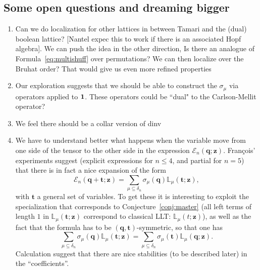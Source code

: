 \documentclass[12pt]{amsart}
\theoremstyle{plain}
\theoremstyle{definition}
\theoremstyle{remark}
\newcommand{\Qvar}{{\bm q}}
\newcommand{\Zvar}{{\bm z}}
\begin{document}
\subsection{Some open questions and dreaming bigger}

\begin{enumerate}
\item Can we do localization for other lattices in between Tamari and the (dual) boolean lattice? [Nantel expec this to work if there is an associated Hopf algebra]. We can push the idea in the other direction, Is there an analogue of Formula~\eqref{eq:multishuff} over permutations? We can then localize over the Bruhat order? That would give us even more refined properties
\item Our exploration suggests that we should be able to construct the $\sigma_\mu$ via operators applied to $\bf 1$. These operators could be ``dual" to the Carlson-Mellit operator?
\item We feel there should be a collar version of dinv
\item We have to understand better what happens when the variable move from one side of the tensor to the other side in the expression ${\mathcal E}_n(\Qvar;\Zvar)$. Fran\c{c}ois' experiments suggest (explicit expressions for $n\leq 4$, and partial for $n=5$) that there is in fact a nice expansion of the form
\begin{equation}
    \mathcal{E}_n(\bm{q}+\bm{t};\bm{z}) = \sum_{\mu\subseteq \delta_n} \sigma_\mu(\bm{q}) \mathbb{L}_\mu(\bm{t};\bm{z}),
  \end{equation}
  with $\bm{t}$ a general set of variables. To get these it is interesting to exploit the specialization that corresponds to  Conjecture~\ref{conj:master} (all left terms of length $1$ in $\mathbb{L}_\mu(\bm{t};\bm{z})$ correspond to classical LLT: $\mathbb{L}_\mu(t;\bm{z})$), as well as the fact that 
  the formula has to be $(\bm{q},\bm{t})$-symmetric, so that one has 
     $$\sum_{\mu\subseteq \delta_n} \sigma_\mu(\bm{q}) \mathbb{L}_\mu(\bm{t};\bm{z})=\sum_{\mu\subseteq \delta_n} \sigma_\mu(\bm{t}) \mathbb{L}_\mu(\bm{q};\bm{z}).$$
     Calculation suggest that there are nice stabilities (to be described later) in the ``coefficients''.
\end{enumerate}


%  
%
\end{document}
